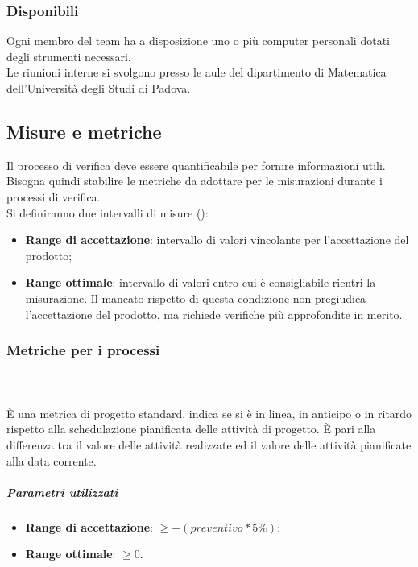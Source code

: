 \documentclass[../PianoDiQualifica.tex]{subfiles}
\begin{document}
			\subsubsection{Disponibili}
				Ogni membro del team ha a disposizione uno o più computer
				personali dotati degli strumenti necessari.\\
				Le riunioni interne si svolgono presso le aule del dipartimento
				di Matematica dell'Università degli Studi di Padova.
		\subsection{Misure e metriche}\label{Misure&Metriche}
			Il processo di verifica deve essere quantificabile per fornire
			informazioni utili. Bisogna quindi stabilire le metriche da adottare
			per le misurazioni durante i processi di verifica.\\
			Si definiranno due intervalli di misure ():
			\begin{itemize}
				\item \textbf{Range di accettazione}: intervallo di valori
				vincolante per l'accettazione del prodotto;
				\item \textbf{Range ottimale}: intervallo di valori entro cui è
				consigliabile rientri la misurazione. Il mancato rispetto di
				questa condizione non pregiudica l'accettazione del prodotto, ma
				richiede verifiche più approfondite in merito.
			\end{itemize}
			\subsubsection{Metriche per i processi}
				\paragraph{\\}
					È una metrica di progetto standard, indica se si è in linea, in
					anticipo o in ritardo rispetto alla schedulazione pianificata delle
					attività di progetto. È pari alla differenza tra il valore delle
					attività realizzate ed il valore delle attività pianificate alla
					data corrente.
					\subparagraph{Parametri utilizzati}
						\begin{itemize}
							\item \textbf{Range di accettazione}: $\geq -(preventivo*5\%)$;
							\item \textbf{Range ottimale}: $\geq 0$.
						\end{itemize}
\end{document}
